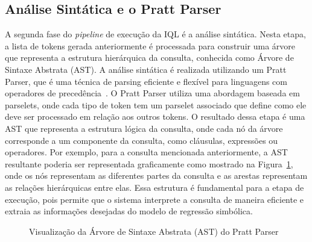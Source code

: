 \subsection{Análise Sintática e o Pratt Parser}
A segunda fase do \textit{pipeline} de execução da IQL é a análise sintática. Nesta etapa, a lista de tokens gerada anteriormente é processada para construir uma árvore que representa a estrutura hierárquica da consulta, conhecida como Árvore de Sintaxe Abstrata (AST). A análise sintática é realizada utilizando um Pratt Parser, que é uma técnica de parsing eficiente e flexível para linguagens com operadores de precedência~\cite{pratt1973top}. O Pratt Parser utiliza uma abordagem baseada em parselets, onde cada tipo de token tem um parselet associado que define como ele deve ser processado em relação aos outros tokens. O resultado dessa etapa é uma AST que representa a estrutura lógica da consulta, onde cada nó da árvore corresponde a um componente da consulta, como cláusulas, expressões ou operadores. Por exemplo, para a consulta mencionada anteriormente, a AST resultante poderia ser representada graficamente como mostrado na Figura~\ref{fig:iql_ast_example}, onde os nós representam as diferentes partes da consulta e as arestas representam as relações hierárquicas entre elas. Essa estrutura é fundamental para a etapa de execução, pois permite que o sistema interprete a consulta de maneira eficiente e extraia as informações desejadas do modelo de regressão simbólica.
\begin{figure}[htbp]
    \caption{Visualização da Árvore de Sintaxe Abstrata (AST) do Pratt Parser}
    \centering
    \label{fig:iql_ast_example}
\end{figure}

